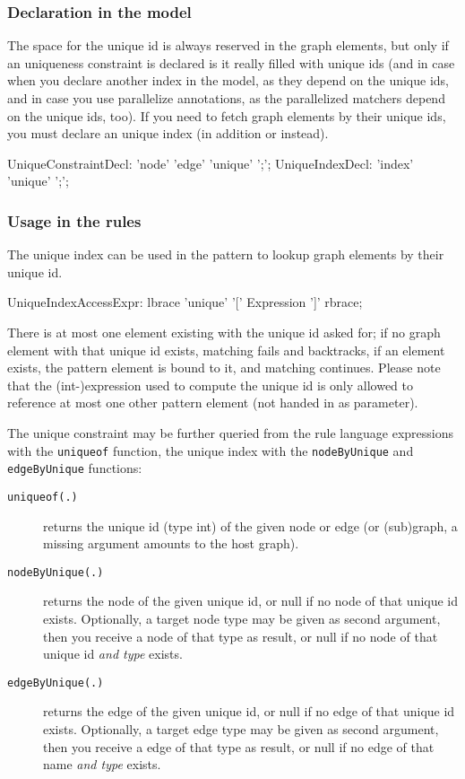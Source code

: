 \subsubsection*{Declaration in the model}
The space for the unique id is always reserved in the graph elements, but only if an uniqueness constraint is declared is it really filled with unique ids (and in case when you declare another index in the model, as they depend on the unique ids, and in case you use parallelize annotations, as the parallelized matchers depend on the unique ids, too).
If you need to fetch graph elements by their unique ids, you must declare an unique index (in addition or instead).

\begin{rail}
  UniqueConstraintDecl: 'node' 'edge' 'unique' ';';
  UniqueIndexDecl: 'index' 'unique' ';';
\end{rail}


\subsubsection*{Usage in the rules}
The unique index can be used in the pattern to lookup graph elements by their unique id.

\begin{rail}
  UniqueIndexAccessExpr:
    lbrace 'unique' '[' Expression ']' rbrace;
\end{rail}

There is at most one element existing with the unique id asked for; if no graph element with that unique id exists, matching fails and backtracks, if an element exists, the pattern element is bound to it, and matching continues.
Please note that the (int-)expression used to compute the unique id is only allowed to reference at most one other pattern element (not handed in as parameter).

The unique constraint may be further queried from the rule language expressions with the \texttt{uniqueof} function,
the unique index with the \texttt{nodeByUnique} and \texttt{edgeByUnique} functions:
\begin{description}
\item[\texttt{uniqueof(.)}] returns the unique id (type int) of the given node or edge (or (sub)graph, a missing argument amounts to the host graph).
\item[\texttt{nodeByUnique(.)}] returns the node of the given unique id, or null if no node of that unique id exists. Optionally, a target node type may be given as second argument, then you receive a node of that type as result, or null if no node of that unique id \emph{and type} exists.
\item[\texttt{edgeByUnique(.)}] returns the edge of the given unique id, or null if no edge of that unique id exists. Optionally, a target edge type may be given as second argument, then you receive a edge of that type as result, or null if no edge of that name \emph{and type} exists.
\end{description}

